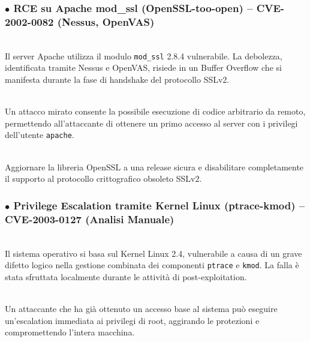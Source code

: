 \documentclass[12pt, a4paper]{article}
\begin{document}
	\newpage
	\subsubsection{ \textcolor{criticalred}{$\bullet$} RCE su Apache mod\_ssl (OpenSSL-too-open) -- CVE-2002-0082 (Nessus, OpenVAS)}
	 \\ \vspace{0.2 cm}
	Il server Apache utilizza il modulo \texttt{mod\_ssl} 2.8.4 vulnerabile. La debolezza, identificata tramite Nessus e OpenVAS, risiede in un Buffer Overflow che si manifesta durante la fase di handshake del protocollo SSLv2.

	\vspace{0.2 cm}
	 \\ \vspace{0.2 cm}
	Un attacco mirato consente la possibile esecuzione di codice arbitrario da remoto, permettendo all'attaccante di ottenere un primo accesso al server con i privilegi dell'utente \texttt{apache}.

	\vspace{0.2 cm}
	 \\ \vspace{0.2 cm}
	Aggiornare la libreria OpenSSL a una release sicura e disabilitare completamente il supporto al protocollo crittografico obsoleto SSLv2.

	\subsubsection{ \textcolor{criticalred}{$\bullet$} Privilege Escalation tramite Kernel Linux (ptrace-kmod) -- CVE-2003-0127 (Analisi Manuale)}
	 \\ \vspace{0.2 cm}
	Il sistema operativo si basa sul Kernel Linux 2.4, vulnerabile a causa di un grave difetto logico nella gestione combinata dei componenti \texttt{ptrace} e \texttt{kmod}. La falla è stata sfruttata localmente durante le attività di post-exploitation.

	\vspace{0.2 cm}
	 \\ \vspace{0.2 cm}
	Un attaccante che ha già ottenuto un accesso base al sistema può eseguire un'escalation immediata ai privilegi di root, aggirando le protezioni e compromettendo l'intera macchina.
\end{document}
